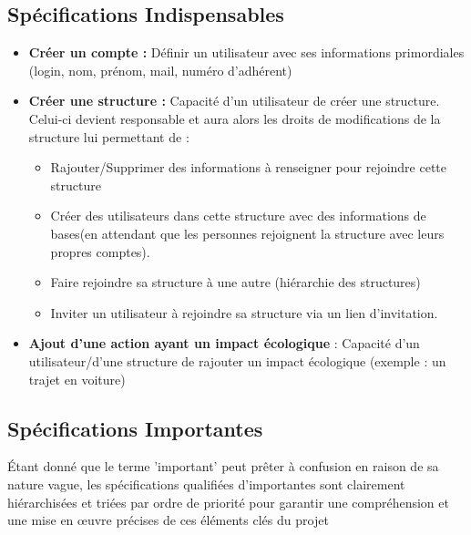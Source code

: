 \subsection{Spécifications Indispensables}

\begin{itemize}
    \item \textbf{Créer un compte :} Définir un utilisateur avec ses informations primordiales (login, nom, prénom, mail, numéro d'adhérent)
    \item \textbf{Créer une structure :} Capacité d'un utilisateur de créer une structure. Celui-ci devient responsable et aura alors les droits de modifications de la structure lui permettant de : 
    \begin{itemize}
        \item Rajouter/Supprimer des informations à renseigner pour rejoindre cette structure
        \item Créer des utilisateurs dans cette structure avec des informations de bases(en attendant que les personnes rejoignent la structure avec leurs propres comptes).
        \item Faire rejoindre sa structure à une autre (hiérarchie des structures)
        \item Inviter un utilisateur à rejoindre sa structure via un lien d'invitation. 
    \end{itemize}
    \item \textbf{Ajout d'une action ayant un impact écologique} : Capacité d'un utilisateur/d'une structure de rajouter un impact écologique (exemple : un trajet en voiture)
\end{itemize}

\subsection{Spécifications Importantes}

Étant donné que le terme 'important' peut prêter à confusion en raison de sa nature vague, les spécifications qualifiées d'importantes sont clairement hiérarchisées et triées par ordre de priorité pour garantir une compréhension et une mise en œuvre précises de ces éléments clés du projet

